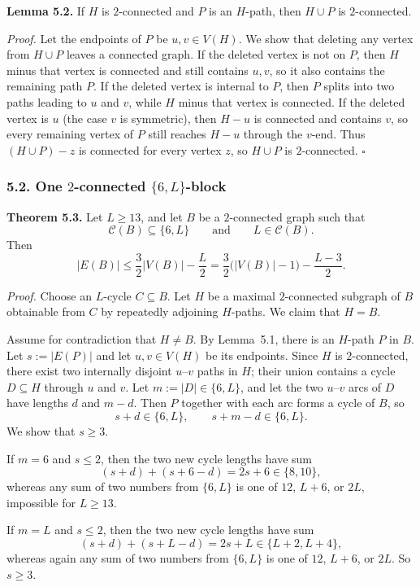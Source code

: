 \medskip
\textbf{Lemma 5.2.}
If $H$ is $2$-connected and $P$ is an $H$-path, then $H\cup P$ is $2$-connected.

\medskip
\textit{Proof.}
Let the endpoints of $P$ be $u,v\in V(H)$.
We show that deleting any vertex from $H\cup P$ leaves a connected graph.
If the deleted vertex is not on $P$, then $H$ minus that vertex is connected and still contains $u,v$, so it also contains the remaining path $P$.
If the deleted vertex is internal to $P$, then $P$ splits into two paths leading to $u$ and $v$, while $H$ minus that vertex is connected.
If the deleted vertex is $u$ (the case $v$ is symmetric), then $H-u$ is connected and contains $v$, so every remaining vertex of $P$ still reaches $H-u$ through the $v$-end.
Thus $(H\cup P)-z$ is connected for every vertex $z$, so $H\cup P$ is $2$-connected.
\hfill$\square$

\subsubsection*{5.2. One $2$-connected $\{6,L\}$-block}

\textbf{Theorem 5.3.}
Let $L\ge 13$, and let $B$ be a $2$-connected graph such that
\[
\mathcal C(B)\subseteq\{6,L\}
\qquad\text{and}\qquad
L\in\mathcal C(B).
\]
Then
\[
|E(B)|\le \frac32|V(B)|-\frac L2
= \frac32\bigl(|V(B)|-1\bigr)-\frac{L-3}{2}.
\]

\medskip
\textit{Proof.}
Choose an $L$-cycle $C\subseteq B$.
Let $H$ be a maximal $2$-connected subgraph of $B$ obtainable from $C$ by repeatedly adjoining $H$-paths.
We claim that $H=B$.

Assume for contradiction that $H\neq B$.
By Lemma~5.1, there is an $H$-path $P$ in $B$.
Let $s:=|E(P)|$ and let $u,v\in V(H)$ be its endpoints.
Since $H$ is $2$-connected, there exist two internally disjoint $u$--$v$ paths in $H$; their union contains a cycle $D\subseteq H$ through $u$ and $v$.
Let $m:=|D|\in\{6,L\}$, and let the two $u$--$v$ arcs of $D$ have lengths $d$ and $m-d$.
Then $P$ together with each arc forms a cycle of $B$, so
\[
s+d\in\{6,L\},
\qquad
s+m-d\in\{6,L\}.
\]
We show that $s\ge 3$.

If $m=6$ and $s\le 2$, then the two new cycle lengths have sum
\[
(s+d)+(s+6-d)=2s+6\in\{8,10\},
\]
whereas any sum of two numbers from $\{6,L\}$ is one of $12$, $L+6$, or $2L$, impossible for $L\ge 13$.

If $m=L$ and $s\le 2$, then the two new cycle lengths have sum
\[
(s+d)+(s+L-d)=2s+L\in\{L+2,L+4\},
\]
whereas again any sum of two numbers from $\{6,L\}$ is one of $12$, $L+6$, or $2L$.
So $s\ge 3$.

